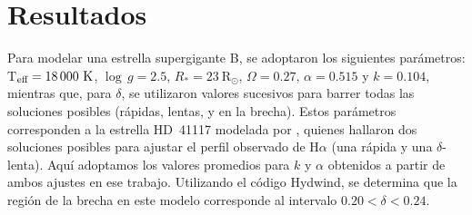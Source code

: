 \documentclass[baaa]{baaa}
\begin{document}
\section{Resultados}\label{resultados}
Para modelar una estrella supergigante B, se adoptaron los siguientes par\'ametros: T$_{\textnormal{eff}} = 18\,000~\mathrm{K}$, $\log\,g = 2.5$, $R_* = 23~\mathrm{R}_{\odot}$, $\Omega = 0.27$, $\alpha = 0.515$ y $k = 0.104$, mientras que, para $\delta$, se utilizaron valores sucesivos para barrer todas las soluciones posibles (r\'apidas, lentas, y en la brecha). Estos par\'ametros corresponden a la estrella HD~41117 modelada por \citet{venero2024}, quienes hallaron dos soluciones posibles para ajustar el perfil observado de H$\alpha$ (una r\'apida y una $\delta$-lenta). Aqu\'i adoptamos los valores promedios para $k$ y $\alpha$ obtenidos a partir de ambos ajustes en ese trabajo. Utilizando el c\'odigo Hydwind, se determina que la regi\'on de la brecha en este modelo corresponde al intervalo $0.20<\delta<0.24$. 
\end{document}
